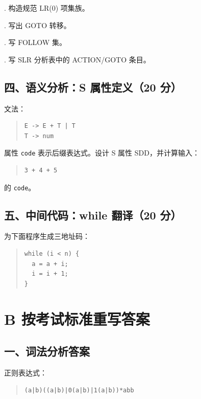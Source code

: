 \documentclass[UTF8,zihao=-4]{ctexart}
\begin{document}
. 构造规范 LR(0) 项集族。\par
{}. 写出 GOTO 转移。\par
{}. 写 FOLLOW 集。\par
{}. 写 SLR 分析表中的 ACTION/GOTO 条目。\par

\subsection*{四、语义分析：S 属性定义（20 分）}

文法：

\begin{quote}
\footnotesize
\begin{verbatim}
E -> E + T | T
T -> num
\end{verbatim}
\end{quote}

属性 \texttt{code} 表示后缀表达式。设计 S 属性 SDD，并计算输入：

\begin{quote}
\footnotesize
\begin{verbatim}
3 + 4 + 5
\end{verbatim}
\end{quote}

的 \texttt{code}。

\subsection*{五、中间代码：while 翻译（20 分）}

为下面程序生成三地址码：

\begin{quote}
\footnotesize
\begin{verbatim}
while (i < n) {
  a = a + i;
  i = i + 1;
}
\end{verbatim}
\end{quote}

\section*{B 按考试标准重写答案}

\subsection*{一、词法分析答案}

正则表达式：

\begin{quote}
\footnotesize
\begin{verbatim}
(a|b)((a|b)|0(a|b)|1(a|b))*abb
\end{verbatim}
\end{quote}
\end{document}
